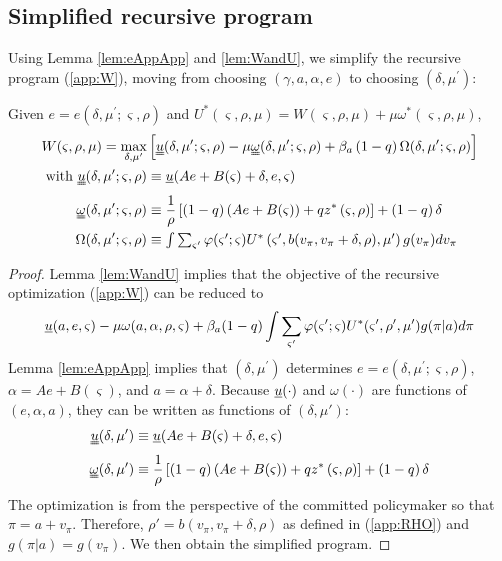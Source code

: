 \documentclass[12pt,letter,leqno]{article}
\theoremstyle{asn}
\theoremstyle{lem}
\theoremstyle{slem}
\theoremstyle{prop}
\theoremstyle{appprop}
\theoremstyle{rem}
\theoremstyle{defn}
\begin{document}
\subsection{Simplified recursive program}\label{appsec:W2}
Using Lemma \ref{lem:eAppApp} and \ref{lem:WandU}, we simplify the recursive program (\ref{app:W}), moving from choosing $(\gamma
,a,\alpha ,e)$ to  choosing $(\delta ,\mu ^{\prime
})$:
\begin{appprop}\label{appprop:W2}%
Given $e =e\left( \delta ,\mu ^{\prime };\varsigma ,\rho \right)$ and $U^*\left( \varsigma ,\rho ,\mu \right)=W(\varsigma,\rho,\mu)+\mu\omega^*(\varsigma,\rho,\mu)$, 
\begin{align}
W(\varsigma,\rho,\mu) =\max_{\delta,\mu^{\prime}}&\left[\uuline{u}(
\delta ,\mu ^{\prime };\varsigma,\rho) -\mu \uuline{\omega}(\delta,\mu^{\prime
};\varsigma,\rho)+\beta_{a}\left( 1-q\right) \Omega( \delta ,\mu ^{\prime
};\varsigma,\rho) \right] \label{app:W2} \\
\text{with }\uuline{u}(\delta,\mu';\varsigma,\rho) &\equiv \uline{u}(Ae+B(\varsigma)+\delta,e,\varsigma) \notag \\
\uuline{\omega}(\delta,\mu';\varsigma,\rho) &\equiv \frac{1}{\rho }\left[
\left( 1-q\right) \left( Ae+B(\varsigma )\right) +qz^{\ast }\left( \varsigma
,\rho \right) \right] +\left( 1-q\right) \delta \notag  \\
\Omega( \delta ,\mu ^{\prime} ;\varsigma,\rho )  &\equiv \textstyle\int \textstyle\sum_{\varsigma^{\prime
}}\varphi( \varsigma ^{\prime };\varsigma ) U^*\left( \varsigma
^{\prime },b( v_\pi ,v_\pi+\delta ,\rho) ,\mu ^{\prime }\right) g (v_\pi )dv_\pi \notag 
\end{align}
\end{appprop}
\begin{proof}
Lemma \ref{lem:WandU} implies that the objective of the recursive optimization (\ref{app:W}) can be reduced to
\begin{equation*}
\uline{u}(a,e,\varsigma) - \mu\omega(a,\alpha,\rho,\varsigma) + \beta_a(1-q)\int\sum_{\varsigma'}\varphi(\varsigma';\varsigma)U^*(\varsigma',\rho',\mu')g(\pi|a)d\pi
\end{equation*}
Lemma \ref{lem:eAppApp} implies that $(\delta ,\mu ^{\prime})$ determines $e=e(\delta ,\mu ^{\prime };\varsigma ,\rho )$, $\alpha=Ae+B(\varsigma )$, and $a=\alpha +\delta$.
Because $\uline{u}(\cdot)$ and $\omega(\cdot)$ are functions of $(e,\alpha,a)$, they can be written as functions of $(\delta,\mu')$:
\begin{align}
\uuline{u}(\delta,\mu') &\equiv \uline{u}(Ae+B(\varsigma)+\delta,e,\varsigma) \\
\uuline{\omega}(\delta,\mu') &\equiv \frac{1}{\rho }\left[
\left( 1-q\right) \left( Ae+B(\varsigma )\right) +qz^{\ast }\left( \varsigma
,\rho \right) \right] +\left( 1-q\right) \delta 
\end{align}
The optimization is from the perspective of the committed policymaker so that $\pi=a+v_{\pi}$. Therefore, $\rho'=b\left( v_\pi,v_\pi +\delta ,\rho \right) $ as defined in (\ref{app:RHO}) and $g(\pi|a)=g(v_\pi)$. We then obtain the simplified program.
\end{proof}
\end{document}
